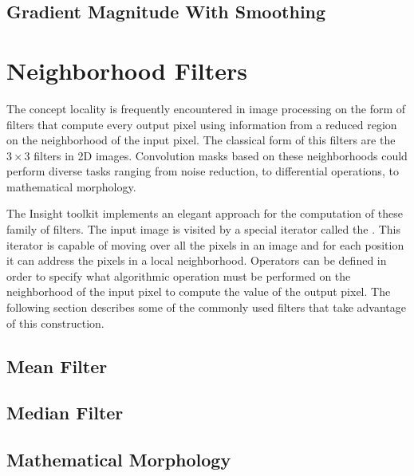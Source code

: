 %

\subsection{Gradient Magnitude With Smoothing}
\label{sec:GradientMagnitudeRecursiveGaussianImageFilter}

%




\section{Neighborhood Filters}
\label{sec:NeighborhoodFilters}

The concept locality is frequently encountered in image processing on the form
of filters that compute every output pixel using information from a reduced
region on the neighborhood of the input pixel. The classical form of this
filters are the $3 \times 3$ filters in 2D images. Convolution masks based on
these neighborhoods could perform diverse tasks ranging from noise reduction,
to differential operations, to mathematical morphology.

The Insight toolkit implements an elegant approach for the computation of these
family of filters. The input image is visited by a special iterator called the
. This iterator is capable of moving over all
the pixels in an image and for each position it can address the pixels in a
local neighborhood. Operators can be defined in order to specify what
algorithmic operation must be performed on the neighborhood of the input pixel
to compute the value of the output pixel. The following section describes some
of the commonly used filters that take advantage of this construction.  

\subsection{Mean Filter}
\label{sec:MeanFilter}

%

\subsection{Median Filter}
\label{sec:MedianFilter}

%


\subsection{Mathematical Morphology}
\label{sec:MathematicalMorphology}

